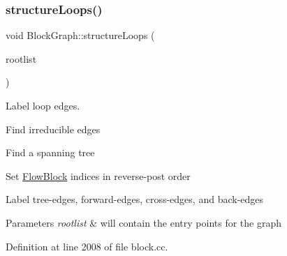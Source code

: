 \subsubsection{\texorpdfstring{structureLoops()}{structureLoops()}}
{\footnotesize\ttfamily void Block\+Graph\+::structure\+Loops (\begin{DoxyParamCaption}\item[{vector$<$ \mbox{\hyperlink{class_flow_block}{Flow\+Block}} $\ast$ $>$ \&}]{rootlist }\end{DoxyParamCaption})}



Label loop edges. 


\begin{DoxyItemize}
\item Find irreducible edges
\item Find a spanning tree
\item Set \mbox{\hyperlink{class_flow_block}{Flow\+Block}} indices in reverse-\/post order
\item Label tree-\/edges, forward-\/edges, cross-\/edges, and back-\/edges 
\begin{DoxyParams}{Parameters}
{\em rootlist} & will contain the entry points for the graph \\
\hline
\end{DoxyParams}

\end{DoxyItemize}

Definition at line 2008 of file block.\+cc.

